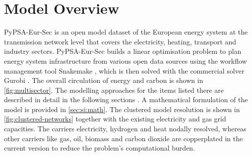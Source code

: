 \section{Model Overview}
\label{sec:si:model-overview}


PyPSA-Eur-Sec is an open model dataset of the European energy system at the
transmission network level that covers the electricity, heating, transport and
industry sectors. PyPSA-Eur-Sec builds a linear optimisation problem to plan
energy system infrastructure from various open data sources using the workflow
management tool Snakemake , which is then solved with the
commercial solver Gurobi . The overall circulation of energy and
carbon is shown in \cref{fig:multisector}. The modelling approaches for the
items listed there are described in detail in the following sections
. A mathematical
formulation of the model is provided in \cref{sec:si:math}. The clustered model
resolution is shown in \cref{fig:clustered-networks} together with the existing
electricity and gas grid capacities. The carriers electricity, hydrogen and heat
nodally resolved, whereas other carriers like gas, oil, biomass and carbon
dioxide are copperplated in the current version to reduce the problem's
computational burden.